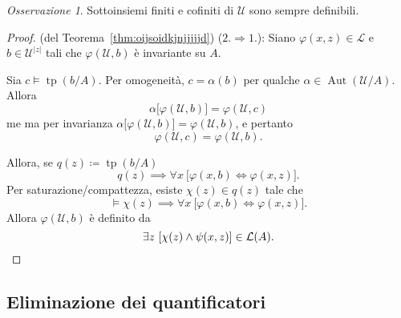 \documentclass[10pt]{article}
\newcommand{\1}{\mathds{1}}
\theoremstyle{definition}%
\theoremstyle{plain}
\theoremstyle{remark}
\newtheorem*{oss}{Osservazione}
\begin{document}
\begin{oss}
Sottoinsiemi finiti e cofiniti di \(\mathcal{U}\) sono sempre definibili.
\end{oss}
\begin{proof}
(del Teorema~\ref{thm:oijsoidkjnjjjjjd})\hspace{0.7em} (\(2.\Rightarrow 1.\)): Siano \(\varphi(x,z) \in \mathcal{L}\) e \(b \in \mathcal{U}^{|z|}\) tali che \(\varphi(\mathcal{U},b)\) è invariante su \(A\).

Sia \(c\vDash \operatorname{tp}(b/A)\). Per omogeneità, \(c=\alpha(b)\) per qualche \(\alpha \in \operatorname{Aut}(\mathcal{U}/A)\). Allora
\begin{equation*}
\alpha\big[\varphi(\mathcal{U},b)\big]=\varphi(\mathcal{U},c)
\end{equation*}
me ma per invarianza \(\alpha\big[\varphi(\mathcal{U},b)\big]=\varphi(\mathcal{U},b)\), e pertanto
\begin{equation*}
\varphi(\mathcal{U},c)=\varphi(\mathcal{U},b).
\end{equation*}

Allora, se \(q(z)\coloneqq\operatorname{tp}(b/A)\)
\begin{equation*}
q(z)\implies \forall x\ \big[\varphi(x,b)\iff\varphi(x,z)\big].
\end{equation*}
Per saturazione/compattezza, esiste \(\chi(z) \in q(z)\) tale che
\begin{equation*}
\vDash \chi(z)\implies \forall x\ \big[\varphi(x,b)\iff\varphi(x,z)\big].
\end{equation*}
Allora \(\varphi(\mathcal{U},b)\) è definito da
\begin{equation*}
\exists z\ [\chi(z) \land \psi(x,z)] \in \mathcal{L}(A).\qedhere
\end{equation*}
\end{proof}
\subsection{Eliminazione dei quantificatori}
\label{sec:org45d789a}
\end{document}
